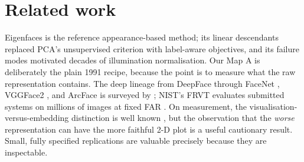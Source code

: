 \section{Related work}\label{sec:related}

Eigenfaces \citep{turk1991} is the reference appearance-based method; its linear descendants replaced PCA's unsupervised criterion with label-aware objectives, and its failure modes motivated decades of illumination normalisation. Our Map A is deliberately the plain 1991 recipe, because the point is to measure what the raw representation contains. The deep lineage from DeepFace \citep{taigman2014} through FaceNet \citep{schroff2015}, VGGFace2 \citep{cao2018}, and ArcFace \citep{deng2019} is surveyed by \citet{wang2021}; NIST's FRVT evaluates submitted systems on millions of images at fixed FAR \citep{grother2019}. On measurement, the visualisation-versus-embedding distinction is well known \citep{maaten2008}, but the observation that the \emph{worse} representation can have the more faithful 2-D plot is a useful cautionary result. Small, fully specified replications are valuable precisely because they are inspectable.
